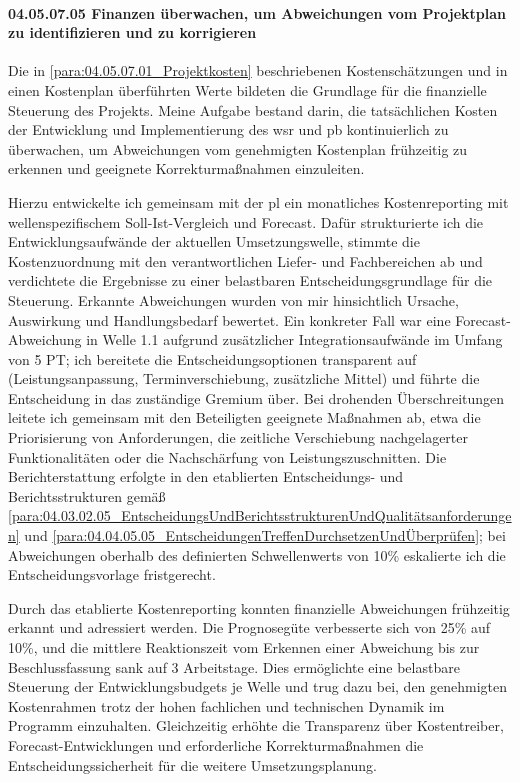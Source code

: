 \paragraph*{04.05.07.05 Finanzen überwachen, um Abweichungen vom Projektplan zu identifizieren und zu korrigieren}
\label{para:04.05.07.05_FinanzenÜberwachen}

\par  Die in \ref{para:04.05.07.01_Projektkosten} beschriebenen Kostenschätzungen und in einen Kostenplan überführten Werte bildeten die Grundlage für die finanzielle Steuerung des Projekts. Meine Aufgabe bestand darin, die tatsächlichen Kosten der Entwicklung und Implementierung des \gls{wsr} und \gls{pb} kontinuierlich zu überwachen, um Abweichungen vom genehmigten Kostenplan frühzeitig zu erkennen und geeignete Korrekturmaßnahmen einzuleiten.

\par Hierzu entwickelte ich gemeinsam mit der \gls{pl} ein monatliches Kostenreporting mit wellenspezifischem Soll-Ist-Vergleich und Forecast. Dafür strukturierte ich die Entwicklungsaufwände der aktuellen Umsetzungswelle, stimmte die Kostenzuordnung mit den verantwortlichen Liefer- und Fachbereichen ab und verdichtete die Ergebnisse zu einer belastbaren Entscheidungsgrundlage für die Steuerung. Erkannte Abweichungen wurden von mir hinsichtlich Ursache, Auswirkung und Handlungsbedarf bewertet. Ein konkreter Fall war eine Forecast-Abweichung in Welle 1.1 aufgrund zusätzlicher Integrationsaufwände im Umfang von 5 PT; ich bereitete die Entscheidungsoptionen transparent auf (Leistungsanpassung, Terminverschiebung, zusätzliche Mittel) und führte die Entscheidung in das zuständige Gremium über. Bei drohenden Überschreitungen leitete ich gemeinsam mit den Beteiligten geeignete Maßnahmen ab, etwa die Priorisierung von Anforderungen, die zeitliche Verschiebung nachgelagerter Funktionalitäten oder die Nachschärfung von Leistungszuschnitten. Die Berichterstattung erfolgte in den etablierten Entscheidungs- und Berichtsstrukturen gemäß \ref{para:04.03.02.05_EntscheidungsUndBerichtsstrukturenUndQualitätsanforderungen} und \ref{para:04.04.05.05_EntscheidungenTreffenDurchsetzenUndÜberprüfen}; bei Abweichungen oberhalb des definierten Schwellenwerts von 10\% eskalierte ich die Entscheidungsvorlage fristgerecht.

\par Durch das etablierte Kostenreporting konnten finanzielle Abweichungen frühzeitig erkannt und adressiert werden. Die Prognosegüte verbesserte sich von 25\% auf 10\%, und die mittlere Reaktionszeit vom Erkennen einer Abweichung bis zur Beschlussfassung sank auf 3 Arbeitstage. Dies ermöglichte eine belastbare Steuerung der Entwicklungsbudgets je Welle und trug dazu bei, den genehmigten Kostenrahmen trotz der hohen fachlichen und technischen Dynamik im Programm einzuhalten. Gleichzeitig erhöhte die Transparenz über Kostentreiber, Forecast-Entwicklungen und erforderliche Korrekturmaßnahmen die Entscheidungssicherheit für die weitere Umsetzungsplanung.

